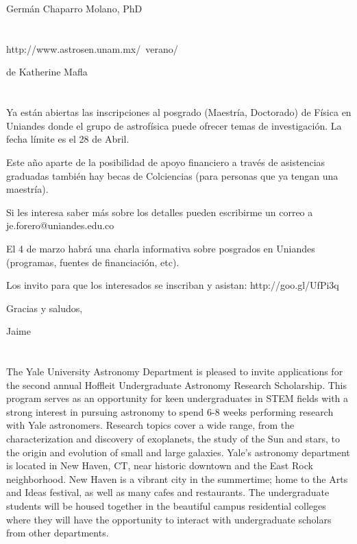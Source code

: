 \documentclass{book}
\begin{document}
Germán Chaparro Molano, PhD

\section*{}


http://www.astrosen.unam.mx/~verano/

de Katherine Mafla

\section*{}

Ya están abiertas las inscripciones al posgrado (Maestría, Doctorado) de Física en Uniandes donde el grupo de astrofísica puede ofrecer temas de investigación. La fecha límite es el 28 de Abril.

Este año aparte de la posibilidad de apoyo financiero a través de asistencias graduadas también hay becas de Colciencias (para personas que ya tengan una maestría).

Si les interesa saber más sobre los detalles pueden escribirme un correo a je.forero@uniandes.edu.co


El 4 de marzo habrá una charla informativa sobre posgrados en Uniandes (programas, fuentes de financiación, etc).

Los invito para que los interesados se inscriban y asistan:
http://goo.gl/UfPi3q


Gracias y saludos,

Jaime

\section*{}

The Yale University Astronomy Department is pleased to invite applications for the second annual Hoffleit Undergraduate Astronomy Research Scholarship. This program serves as an opportunity for keen undergraduates in STEM fields with a strong interest in pursuing astronomy to spend 6-8 weeks performing research with Yale astronomers. Research topics cover a wide range, from the characterization and discovery of exoplanets, the study of the Sun and stars, to the origin and evolution of small and large galaxies. Yale’s astronomy department is located in New Haven, CT, near historic downtown and the East Rock neighborhood. New Haven is a vibrant city in the summertime; home to the Arts and Ideas festival, as well as many cafes and restaurants. The undergraduate students will be housed together in the beautiful campus residential colleges where they will have the opportunity to interact with undergraduate scholars from other departments.
\end{document}
